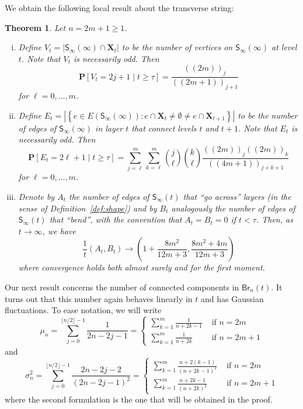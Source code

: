 \documentclass[a4paper,11pt,reqno]{amsart}
\newcommand{\bP}{\mathbf{P}}
\newcommand{\Br}{\mathsf{Br}}
\newcommand{\Soo}{\mathsf{S}_\infty}
\newcommand{\fdf}[1]{(\!(#1)\!)}
\newtheorem{theorem}[lemma]{Theorem}
\theoremstyle{definition}
\begin{document}
We obtain the following local result about the transverse string:
\begin{theorem}\label{theorem:Soolocal}
 Let $n=2m+1\geq 1$.
 \begin{enumerate}[(i)]
  \item Define $V_t=\left|\Soo(\infty)\cap \mathbf{X}_t\right|$ to be the number of vertices on $\Soo(\infty)$ at level $t$. Note that $V_t$ is necessarily odd. Then
  \begin{equation}\label{eq:Vdist}
   \bP[V_t=2j+1\mid  t \geq \tau]=\frac{\fdf{2m}_j}{\fdf{2m+1}_{j+1}}
  \end{equation}
  for $\ell=0,\dots,m$.
  \item Define $E_t = \left|\left\{e\in E(\Soo(\infty)): e\cap \mathbf{X}_t\neq \emptyset \neq e\cap \mathbf{X}_{t+1}\right\}\right|$ 
  to be the number of edges of $\Soo(\infty)$ in layer $t$ that connect levels $t$ and $t+1$. Note that $E_t$ is necessarily odd. Then
  \begin{equation}\label{eq:Edist}
   \bP[E_t=2\ell+1\mid  t \geq \tau]=\sum_{j=\ell}^m \sum_{k=\ell}^m \binom{j}{\ell}\binom{k}{\ell}\frac{\fdf{2m}_j \fdf{2m}_k}{\fdf{4m+1}_{j+k+1}}
  \end{equation}
  for $\ell=0,\dots,m$.
  \item Denote by $A_t$ the number of edges of $\Soo(t)$ that ``go across'' layers (in the sense of Definition~\ref{def:shape}) and by $B_t$ analogously the number of edges of $\Soo(t)$ that ``bend'', with the convention that $A_t=B_t=0$ if $t < \tau$. Then, as $t\to\infty$, we have 
  \begin{equation}\label{eq:ABLLN}
   \frac{1}{t}(A_t,B_t) \to \left(1+\frac{8m^2}{12m+3},\frac{8m^2+4m}{12m+3}\right)
  \end{equation}
  where convergence holds both almost surely and for the first moment.
 \end{enumerate}
\end{theorem}


Our next result concerns the number of connected components in $\Br_n(t)$. It turns out that this number again behaves linearly in $t$ and has Gaussian fluctuations. To ease notation, we will write 
\[
 \mu_n=\sum_{j=0}^{\lfloor n/2\rfloor-1} \frac{1}{2n-2j-1}=
       \begin{cases}
        \sum_{k=1}^m \frac{1}{n+2k-1} & \text{ if } n=2m\\
        \sum_{k=1}^m \frac{1}{n+2k} & \text{ if } n=2m+1
       \end{cases}
\]
and 
\[
 \sigma^2_n=\sum_{j=0}^{\lfloor n/2\rfloor-1} \frac{2n-2j-2}{(2n-2j-1)^2}=
            \begin{cases}
             \sum_{k=1}^m \frac{n+2(k-1)}{(n+2k-1)^2} & \text{ if } n=2m\\
             \sum_{k=1}^m \frac{n+2k-1}{(n+2k)^2} & \text{ if } n=2m+1
            \end{cases}
\]
where the second formulation is the one that will be obtained in the proof.
\end{document}
